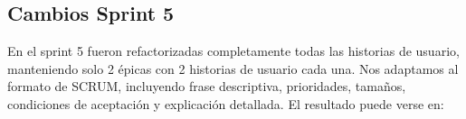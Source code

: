 \documentclass[../../SCRUM.tex]{subfiles}
\begin{document}
\subsection{Cambios Sprint 5}
En el sprint 5 fueron refactorizadas completamente todas las historias
de usuario, manteniendo solo 2 épicas con 2 historias de usuario cada
una. Nos adaptamos al formato de SCRUM, incluyendo frase descriptiva,
prioridades, tamaños, condiciones de aceptación y explicación detallada.
El resultado puede verse en:
\end{document}
